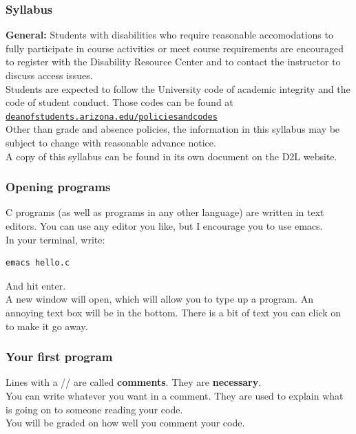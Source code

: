 \documentclass{beamer}
\begin{document}
\begin{frame}
  \frametitle{Syllabus}
  \textbf{General:} Students with disabilities who require reasonable 
  accomodations to fully participate in course activities or meet
  course requirements are encouraged to register with the Disability
  Resource Center and to contact the instructor to discuss access issues.\\
  \vspace{12pt}
  Students are expected to follow the University code of academic integrity
  and the code of student conduct. Those codes can be found at\\
  \href{http://deanofstudents.arizona.edu/policiesandcodes}{\nolinkurl{deanofstudents.arizona.edu/policiesandcodes}}\\
  \vspace{12pt}
  Other than grade and absence policies, the information in this syllabus
  may be subject to change with reasonable advance notice.\\
  \vspace{12pt}
  A copy of this syllabus can be found in its own document on the D2L website.
\end{frame}

\begin{frame}[fragile]
  \frametitle{Opening programs}
  C programs (as well as programs in any other language) are written in 
  text editors. You can use any editor you like, but I encourage you to use
  emacs.\\
  In your terminal, write:
  \begin{lstlisting}[style=custombash]
    emacs hello.c
  \end{lstlisting}
  And hit enter.\\
  A new window will open, which will allow you to type up a program. An annoying text box
  will be in the bottom. There is a bit of text you can click on to make it go away.
\end{frame}

\begin{frame}[fragile]
  \frametitle{Your first program}
  
  Lines with a // are called \textbf{comments}. 
  They are \textbf{necessary}.\\
  You can write whatever you want in a comment. They are used to explain
  what is going on to someone reading your code.\\
  You will be graded on how well you comment your code.
\end{frame}
\end{document}
